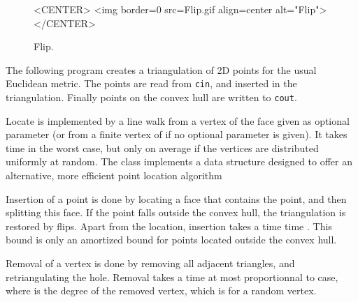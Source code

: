 \begin{figure}
\begin{ccTexOnly}
\begin{center} %

\end{center}
\end{ccTexOnly} 
\caption{Flip.
\label{I1_fig_flip_bis}}

\begin{ccHtmlOnly}
<CENTER>
<img border=0 src=Flip.gif align=center alt="Flip">
</CENTER>
\end{ccHtmlOnly} 
\end{figure}











\ccExample

The following program  creates a  triangulation of 2D points
for the  usual Euclidean metric. The points are read from {\tt cin},
and inserted in the triangulation.
Finally points on the convex hull are written to {\tt cout}. 



Locate is implemented by a line walk from a vertex of the face given
as optional parameter (or from a finite vertex of
 if no optional parameter is given). It takes
time  in the worst case, but only 
on average if the vertices are distributed uniformly at random.
The class  
implements a data structure  designed to
offer an alternative, more efficient point location algorithm

Insertion of a point is done by locating a face that contains the
point, and then splitting this face.
If the point falls outside the convex hull, the triangulation
 is restored by flips.  Apart from the location, insertion takes a time 
time . This bound is only an amortized bound
for points located outside the convex hull.

Removal of a vertex is done by removing all adjacent triangles, and
retriangulating the hole. Removal takes a time  at most proportionnal to
 case, where
  is the degree of the removed vertex,
which is  for a random vertex.

